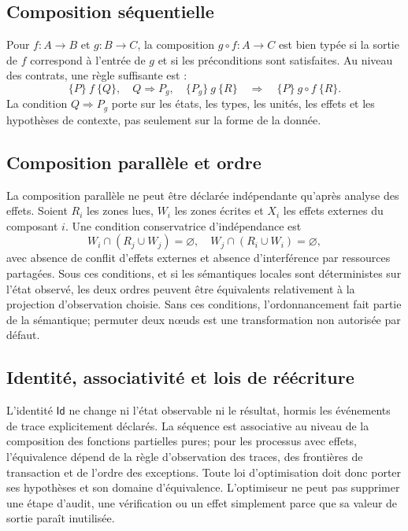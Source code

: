 \documentclass[11pt,a4paper]{article}
\theoremstyle{definition}
\theoremstyle{plain}
\theoremstyle{remark}
\begin{document}
\subsection{Composition séquentielle}
Pour $f:A\to B$ et $g:B\to C$, la composition $g\circ f:A\to C$ est bien typée si la sortie de $f$ correspond à l'entrée de $g$ et si les préconditions sont satisfaites. Au niveau des contrats, une règle suffisante est :
\[
\{P\}\ f\ \{Q\},\quad Q\Rightarrow P_g,\quad \{P_g\}\ g\ \{R\}
\quad\Longrightarrow\quad \{P\}\ g\circ f\ \{R\}.
\]
La condition $Q\Rightarrow P_g$ porte sur les états, les types, les unités, les effets et les hypothèses de contexte, pas seulement sur la forme de la donnée.

\subsection{Composition parallèle et ordre}
La composition parallèle ne peut être déclarée indépendante qu'après analyse des effets. Soient $R_i$ les zones lues, $W_i$ les zones écrites et $X_i$ les effets externes du composant $i$. Une condition conservatrice d'indépendance est
\[
W_i\cap(R_j\cup W_j)=\varnothing,\quad W_j\cap(R_i\cup W_i)=\varnothing,
\]
avec absence de conflit d'effets externes et absence d'interférence par ressources partagées. Sous ces conditions, et si les sémantiques locales sont déterministes sur l'état observé, les deux ordres peuvent être équivalents relativement à la projection d'observation choisie. Sans ces conditions, l'ordonnancement fait partie de la sémantique; permuter deux nœuds est une transformation non autorisée par défaut.

\subsection{Identité, associativité et lois de réécriture}
L'identité $\mathsf{Id}$ ne change ni l'état observable ni le résultat, hormis les événements de trace explicitement déclarés. La séquence est associative au niveau de la composition des fonctions partielles pures; pour les processus avec effets, l'équivalence dépend de la règle d'observation des traces, des frontières de transaction et de l'ordre des exceptions. Toute loi d'optimisation doit donc porter ses hypothèses et son domaine d'équivalence. L'optimiseur ne peut pas supprimer une étape d'audit, une vérification ou un effet simplement parce que sa valeur de sortie paraît inutilisée.
\end{document}
